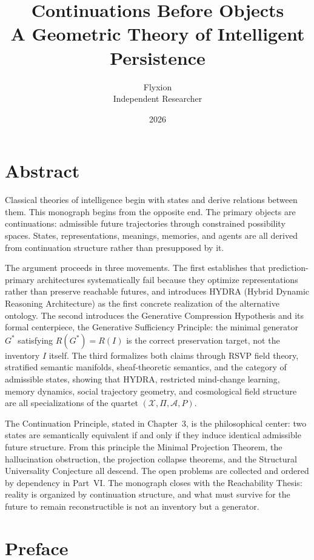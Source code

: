 \documentclass[12pt, oneside]{book}
\title{\textbf{Continuations Before Objects}\\[0.6em]
       \large A Geometric Theory of Intelligent Persistence}
\author{Flyxion\\[0.4em]\small Independent Researcher}
\date{2026}
\theoremstyle{flyxion}
\theoremstyle{definition}
\begin{document}
\maketitle

\chapter*{Abstract}

Classical theories of intelligence begin with states and derive relations
between them. This monograph begins from the opposite end. The primary
objects are continuations: admissible future trajectories through
constrained possibility spaces. States, representations, meanings,
memories, and agents are all derived from continuation structure rather
than presupposed by it.

The argument proceeds in three movements. The first establishes that
prediction-primary architectures systematically fail because they optimize
representations rather than preserve reachable futures, and introduces
HYDRA (Hybrid Dynamic Reasoning Architecture) as the first concrete
realization of the alternative ontology. The second introduces the
Generative Compression Hypothesis and its formal centerpiece, the
Generative Sufficiency Principle: the minimal generator $G^*$ satisfying
$R(G^*) = R(I)$ is the correct preservation target, not the inventory
$I$ itself. The third formalizes both claims through RSVP field theory,
stratified semantic manifolds, sheaf-theoretic semantics, and the
category of admissible states, showing that HYDRA, restricted
mind-change learning, memory dynamics, social trajectory geometry, and
cosmological field structure are all specializations of the quartet
$(\mathcal{X}, \Pi, \mathcal{A}, P)$.

The Continuation Principle, stated in Chapter~3, is the philosophical
center: two states are semantically equivalent if and only if they induce
identical admissible future structure. From this principle the Minimal
Projection Theorem, the hallucination obstruction, the projection
collapse theorems, and the Structural Universality Conjecture all
descend. The open problems are collected and ordered by dependency in
Part~VI. The monograph closes with the Reachability Thesis: reality is
organized by continuation structure, and what must survive for the future
to remain reconstructible is not an inventory but a generator.

\chapter*{Preface}
\end{document}
